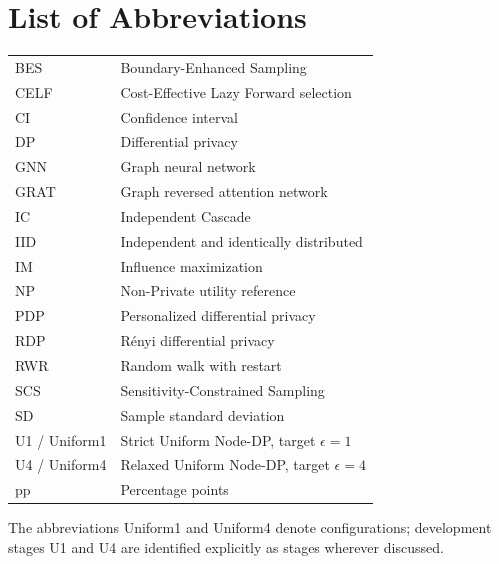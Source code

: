 \chapter*{List of Abbreviations}
\begin{tabular}{ll}
BES & Boundary-Enhanced Sampling\\
CELF & Cost-Effective Lazy Forward selection\\
CI & Confidence interval\\
DP & Differential privacy\\
GNN & Graph neural network\\
GRAT & Graph reversed attention network\\
IC & Independent Cascade\\
IID & Independent and identically distributed\\
IM & Influence maximization\\
NP & Non-Private utility reference\\
PDP & Personalized differential privacy\\
RDP & R\'enyi differential privacy\\
RWR & Random walk with restart\\
SCS & Sensitivity-Constrained Sampling\\
SD & Sample standard deviation\\
U1 / Uniform1 & Strict Uniform Node-DP, target $\epsilon=1$\\
U4 / Uniform4 & Relaxed Uniform Node-DP, target $\epsilon=4$\\
pp & Percentage points
\end{tabular}

The abbreviations Uniform1 and Uniform4 denote configurations; development stages U1 and U4 are identified explicitly as stages wherever discussed.
\clearpage
